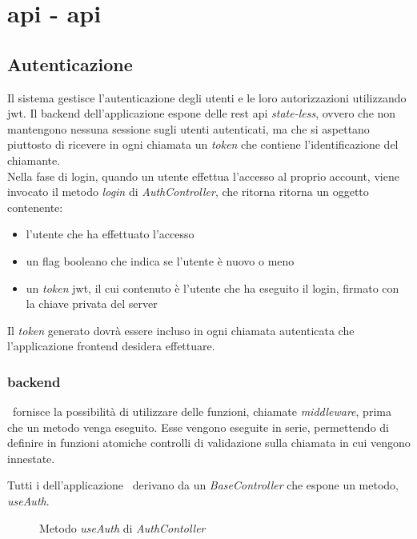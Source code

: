 \chapter{\acrshort{api} - \acrlong{api}}

\section{Autenticazione}
\label{chap:api}

Il sistema gestisce l'autenticazione degli utenti e le loro autorizzazioni utilizzando \gls{jwt}. Il \gls{backend} dell'applicazione espone delle \acrshort{rest} \acrshort{api} \textit{state-less}, ovvero che non mantengono nessuna sessione sugli utenti autenticati, ma che si aspettano piuttosto di ricevere in ogni chiamata un \textit{token} che contiene l'identificazione del chiamante. \\

\noindent
Nella fase di login, quando un utente effettua l'accesso al proprio account, viene invocato il metodo \textit{login} di \textit{AuthController}, che ritorna ritorna un oggetto contenente:
\begin{itemize}[itemsep=0pt]
	\item l'utente che ha effettuato l'accesso
	\item un flag booleano che indica se l'utente è nuovo o meno
	\item un \textit{token} \acrshort{jwt}, il cui contenuto è l'utente che ha eseguito il login, firmato con la chiave privata del server
\end{itemize}

\noindent 
Il \textit{token} generato dovrà essere incluso in ogni chiamata autenticata che l'applicazione \gls{frontend} desidera effettuare.

\subsection{\Gls{backend}}
\label{chap:auth-backend}
\expressjs~fornisce la possibilità di utilizzare delle funzioni, chiamate \textit{middleware}, prima che un metodo venga eseguito. Esse vengono eseguite in serie, permettendo di definire in funzioni atomiche controlli di validazione sulla chiamata in cui vengono innestate.

Tutti i \textit{} dell'applicazione \nodejs~derivano da un \textit{BaseController} che espone un metodo, \textit{useAuth}.

\begin{figure}[H] 
	\centering    
	
	\caption[Metodo \textit{useAuth} di \textit{AuthContoller}]{Metodo \textit{useAuth} di \textit{AuthContoller}}
	\label{fig:server-base-controller}
\end{figure}

